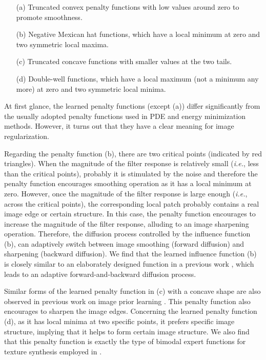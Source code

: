 \documentclass[10pt,journal,compsoc]{IEEEtran}
\newcommand{\ie}{\emph{i.e.}}
\begin{document}
\begin{itemize}
\setlength\itemsep{0em}
\item[(a)] Truncated convex penalty functions with low values around
  zero to promote smoothness.
\item[(b)] Negative Mexican hat functions, which have a local minimum
  at zero and two symmetric local maxima.
\item[(c)] Truncated concave functions with smaller values at the two
  tails.
\item[(d)] Double-well functions, which have a local maximum (not a
  minimum any more) at zero and two symmetric local minima.
\end{itemize}
At first glance, the learned penalty functions (except (a)) differ
significantly from the usually adopted penalty functions used in PDE
and energy minimization methods. However, it turns out that they have
a clear meaning for image regularization.

Regarding the penalty function (b), there are two critical points (indicated by red triangles). When the magnitude of the 
filter response is relatively small (\ie, less than the critical points), 
probably it is stimulated by the noise and therefore the penalty function encourages 
smoothing operation as it has a local minimum at zero. However, once the magnitude of the filter response is large enough 
(\ie, across the critical points), the corresponding local patch probably contains a real image edge or certain structure. 
In this case, the penalty function encourages to increase the magnitude of the filter response, alluding to an image sharpening 
operation. Therefore, the diffusion process controlled by the influence function (b), can adaptively switch between 
image smoothing (forward diffusion) and sharpening (backward diffusion). We find that the learned influence function (b) is closely 
similar to an elaborately designed function in a previous work \cite{gilboa2002forward}, 
which leads to an adaptive forward-and-backward diffusion process. 

Similar forms of the learned penalty function in (c) with a concave shape 
are also observed in previous work on image prior learning \cite{zhu1997prior}. This penalty function also encourages to 
sharpen the image edges. Concerning the learned penalty function (d), as it has local minima at two specific points, it 
prefers specific image structure, implying that it helps to form certain image structure. We also find that this penalty function is 
exactly the type of bimodal expert functions for texture synthesis employed in \cite{HeessWH09}. 
\end{document}

